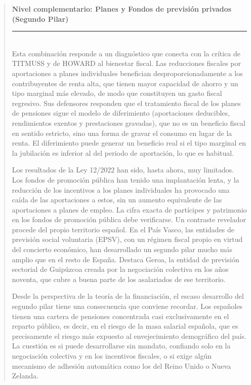 \documentclass[10pt,a4paper]{article}
\newenvironment{specialblock}[1]{%
      \begin{quote} %
      \small %
      \noindent\textbf{#1}\\[-0.3em] %
      \rule{\linewidth}{0.4pt}\\[0.6em]}{
      \end{quote}}
\begin{document}
\begin{specialblock}{\textbf{Nivel complementario}: Planes y Fondos de previsión privados (Segundo Pilar)}
    Esta combinación responde a un diagnóstico que conecta con la crítica de TITMUSS y de HOWARD al bienestar fiscal. Las reducciones fiscales por aportaciones a planes individuales benefician desproporcionadamente a los contribuyentes de renta alta, que tienen mayor capacidad de ahorro y un tipo marginal más elevado, de modo que constituyen un gasto fiscal regresivo. Sus defensores responden que el tratamiento fiscal de los planes de pensiones sigue el modelo de diferimiento (aportaciones deducibles, rendimientos exentos y prestaciones gravadas), que no es un beneficio fiscal en sentido estricto, sino una forma de gravar el consumo en lugar de la renta. El diferimiento puede generar un beneficio real si el tipo marginal en la jubilación es inferior al del periodo de aportación, lo que es habitual.
    
    Los resultados de la Ley 12/2022 han sido, hasta ahora, muy limitados. Los fondos de promoción pública han tenido una implantación lenta, y la reducción de los incentivos a los planes individuales ha provocado una caída de las aportaciones a estos, sin un aumento equivalente de las aportaciones a planes de empleo. La cifra exacta de partícipes y patrimonio en los fondos de promoción pública debe verificarse. Un contraste revelador procede del propio territorio español. En el País Vasco, las entidades de previsión social voluntaria (EPSV), con un régimen fiscal propio en virtud del concierto económico, han desarrollado un segundo pilar mucho más amplio que en el resto de España. Destaca Geroa, la entidad de previsión sectorial de Guipúzcoa creada por la negociación colectiva en los años noventa, que cubre a buena parte de los asalariados de ese territorio. 
    
    Desde la perspectiva de la teoría de la financiación, el escaso desarrollo del segundo pilar tiene una consecuencia que conviene recordar. Los españoles tienen una cartera de pensiones concentrada casi exclusivamente en el reparto público, es decir, en el riesgo de la masa salarial española, que es precisamente el riesgo más expuesto al envejecimiento demográfico del país. La cuestión es si puede desarrollarse sin mandato, confiando solo en la negociación colectiva y en los incentivos fiscales, o si exige algún mecanismo de adhesión automática como los del Reino Unido o Nueva Zelanda.
\end{specialblock}
\end{document}
